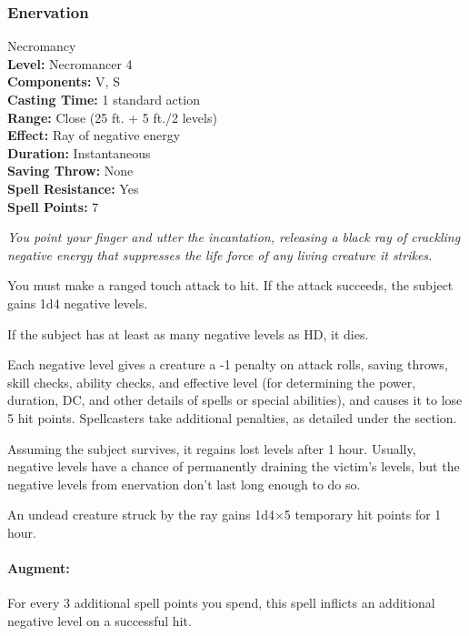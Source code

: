 \subsubsection{Enervation}
\label{Spell:Enervation}
Necromancy
\\ \textbf{Level:} Necromancer 4
\\ \textbf{Components:} V, S
\\ \textbf{Casting Time:} 1 standard action
\\ \textbf{Range:} Close (25 ft. + 5 ft./2 levels)
\\ \textbf{Effect:} Ray of negative energy
\\ \textbf{Duration:} Instantaneous
\\ \textbf{Saving Throw:} None
\\ \textbf{Spell Resistance:} Yes
\\ \textbf{Spell Points:} 7

\emph{You point your finger and utter the incantation, releasing a black ray of crackling negative energy that suppresses the life force of any living creature it strikes.} 

You must make a ranged touch attack to hit.
If the attack succeeds, the subject gains 1d4 negative levels.

If the subject has at least as many negative levels as HD, it dies. 

Each negative level gives a creature a -1 penalty on attack rolls, saving throws, 
skill checks, ability checks, and effective level (for determining the power, duration, DC, and other details of spells or special abilities), 
and causes it to lose 5 hit points.
Spellcasters take additional penalties, as detailed under the  section.

Assuming the subject survives, it regains lost levels after 1 hour. 
Usually, negative levels have a chance of permanently draining the victim's levels,
but the negative levels from enervation don't last long enough to do so.

An undead creature struck by the ray gains 1d4$\times$5 temporary hit points for 1 hour.

\paragraph{Augment:} For every 3 additional spell points you spend, this spell inflicts an additional negative level on a successful hit.

